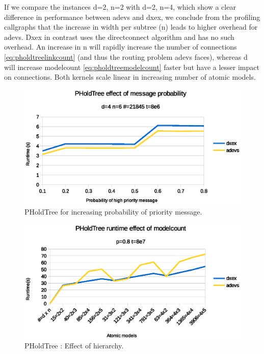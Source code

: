 If we compare the instances d=2, n=2 with d=2, n=4, which show a clear difference in performance between adevs and dxex, we conclude from the profiling callgraphs that the increase in width per subtree (n) leads to higher overhead for adevs.
Dxex in contrast uses the directconnect algorithm and has no such overhead.
An increase in n will rapidly increase the number of connections \ref{eq:pholdtreelinkcount} (and thus the routing problem adevs faces), whereas d will increase modelcount \ref{eq:pholdtreemodelcount} faster but have a lesser impact on connections.
Both kernels scale linear in increasing number of atomic models.

\begin{figure}
    \center
    \includegraphics[width=\plotfraction\columnwidth]{fig/pholdtree_sequential_p.eps}
    \caption{PHoldTree for increasing probability of priority message.}
    \label{fig:PHoldtree_seq_p_benchmark}
\end{figure}
\begin{figure}
    \center
    \includegraphics[width=\plotfraction\columnwidth]{fig/pholdtree_sequential_dn.eps}
    \caption{PHoldTree : Effect of hierarchy.}
    \label{fig:PHoldtree_seq_dn_benchmark}
\end{figure}

